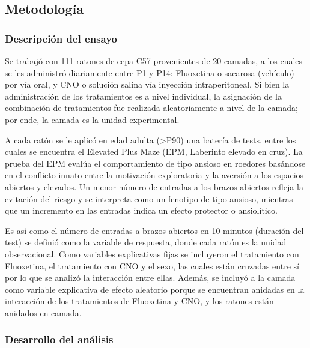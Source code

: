 \documentclass[
  letterpaper,
  DIV=11,
  numbers=noendperiod]{scrartcl}
\begin{document}
\subsection{\texorpdfstring{\textbf{Metodología}}{Metodología}}\label{metodologuxeda}

\subsubsection{\texorpdfstring{\textbf{Descripción del
ensayo}}{Descripción del ensayo}}\label{descripciuxf3n-del-ensayo}

Se trabajó con 111 ratones de cepa C57 provenientes de 20 camadas, a los
cuales se les administró diariamente entre P1 y P14: Fluoxetina o
sacarosa (vehículo) por vía oral, y CNO o solución salina vía inyección
intraperitoneal. Si bien la administración de los tratamientos es a
nivel individual, la asignación de la combinación de tratamientos fue
realizada aleatoriamente a nivel de la camada; por ende, la camada es la
unidad experimental.~

A cada ratón se le aplicó en edad adulta (\textgreater P90) una batería
de tests, entre los cuales se encuentra el Elevated Plus Maze (EPM,
Laberinto elevado en cruz). La prueba del EPM evalúa el comportamiento
de tipo ansioso en roedores basándose en el conflicto innato entre la
motivación exploratoria y la aversión a los espacios abiertos y
elevados. Un menor número de entradas a los brazos abiertos refleja la
evitación del riesgo y se interpreta como un fenotipo de tipo ansioso,
mientras que un incremento en las entradas indica un efecto protector o
ansiolítico.

Es así como el número de entradas a brazos abiertos en 10 minutos
(duración del test) se definió como la variable de respuesta, donde cada
ratón es la unidad observacional. Como variables explicativas fijas se
incluyeron el tratamiento con Fluoxetina, el tratamiento con CNO y el
sexo, las cuales están cruzadas entre sí por lo que se analizó la
interacción entre ellas. Además, se incluyó a la camada como variable
explicativa de efecto aleatorio porque se encuentran anidadas en la
interacción de los tratamientos de Fluoxetina y CNO, y los ratones están
anidados en camada.

\subsubsection{Desarrollo del
análisis}\label{desarrollo-del-anuxe1lisis}
\end{document}
